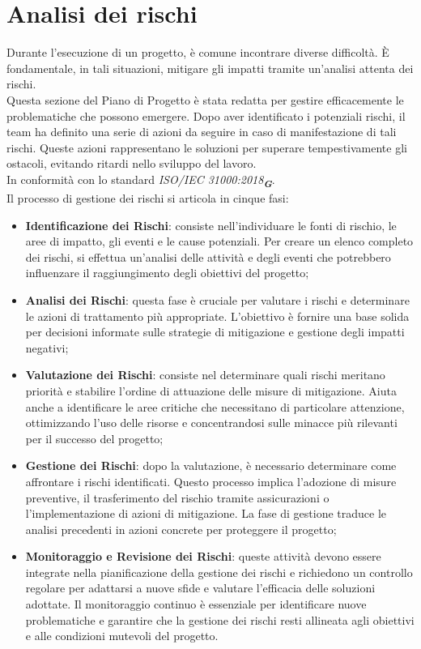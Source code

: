 \section{Analisi dei rischi}
\label{sec:analisi_rischi}
Durante l'esecuzione di un progetto, è comune incontrare diverse difficoltà. È fondamentale, in tali situazioni, mitigare gli impatti tramite un'analisi attenta dei rischi.\\
Questa sezione del Piano di Progetto è stata redatta per gestire efficacemente le problematiche che possono emergere. Dopo aver identificato i potenziali rischi, il team ha definito una serie di azioni da seguire in caso di manifestazione di tali rischi. Queste azioni rappresentano le soluzioni per superare tempestivamente gli ostacoli, evitando ritardi nello sviluppo del lavoro.\\
In conformità con lo standard \emph{ISO/IEC 31000:2018}\textsubscript{\textit{\textbf{G}}}.\\
Il processo di gestione dei rischi si articola in cinque fasi:
\begin{itemize}
    \item \textbf{Identificazione dei Rischi}: consiste nell'individuare le fonti di rischio, le aree di impatto, gli eventi e le cause potenziali. Per creare un elenco completo dei rischi, si effettua un'analisi delle attività e degli eventi che potrebbero influenzare il raggiungimento degli obiettivi del progetto;
    \item \textbf{Analisi dei Rischi}: questa fase è cruciale per valutare i rischi e determinare le azioni di trattamento più appropriate. L'obiettivo è fornire una base solida per decisioni informate sulle strategie di mitigazione e gestione degli impatti negativi;
    \item \textbf{Valutazione dei Rischi}: consiste nel determinare quali rischi meritano priorità e stabilire l'ordine di attuazione delle misure di mitigazione. Aiuta anche a identificare le aree critiche che necessitano di particolare attenzione, ottimizzando l'uso delle risorse e concentrandosi sulle minacce più rilevanti per il successo del progetto;
    \item \textbf{Gestione dei Rischi}: dopo la valutazione, è necessario determinare come affrontare i rischi identificati. Questo processo implica l'adozione di misure preventive, il trasferimento del rischio tramite assicurazioni o l'implementazione di azioni di mitigazione. La fase di gestione traduce le analisi precedenti in azioni concrete per proteggere il progetto;
    \item \textbf{Monitoraggio e Revisione dei Rischi}: queste attività devono essere integrate nella pianificazione della gestione dei rischi e richiedono un controllo regolare per adattarsi a nuove sfide e valutare l'efficacia delle soluzioni adottate. Il monitoraggio continuo è essenziale per identificare nuove problematiche e garantire che la gestione dei rischi resti allineata agli obiettivi e alle condizioni mutevoli del progetto.
\end{itemize}

